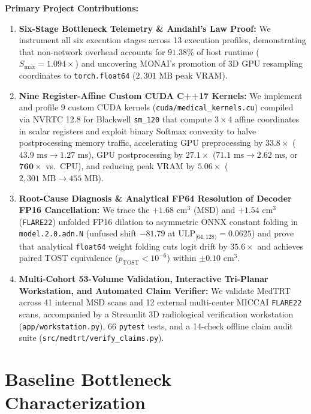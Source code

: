 \documentclass[10pt,twocolumn]{article}
\begin{document}
\noindent\textbf{Primary Project Contributions:}
\begin{enumerate}
    \item \textbf{Six-Stage Bottleneck Telemetry \& Amdahl's Law Proof:} We instrument all six execution stages across 13 execution profiles, demonstrating that non-network overhead accounts for $91.38\%$ of host runtime ($S_{\max} = 1.094\times$) and uncovering MONAI's promotion of 3D GPU resampling coordinates to \texttt{torch.float64} ($2,301\text{ MB}$ peak VRAM).
    \item \textbf{Nine Register-Affine Custom CUDA C++17 Kernels:} We implement and profile 9 custom CUDA kernels (\texttt{cuda/medical\_kernels.cu}) compiled via NVRTC 12.8 for Blackwell \texttt{sm\_120} that compute $3 \times 4$ affine coordinates in scalar registers and exploit binary Softmax convexity to halve postprocessing memory traffic, accelerating GPU preprocessing by $\mathbf{33.8\times}$ ($43.9\text{ ms} \to 1.27\text{ ms}$), GPU postprocessing by $\mathbf{27.1\times}$ ($71.1\text{ ms} \to 2.62\text{ ms}$, or $\mathbf{760\times}$ vs.\ CPU), and reducing peak VRAM by $\mathbf{5.06\times}$ ($2,301\text{ MB} \to 455\text{ MB}$).
    \item \textbf{Root-Cause Diagnosis \& Analytical FP64 Resolution of Decoder FP16 Cancellation:} We trace the $+1.68\text{ cm}^3$ (MSD) and $+1.54\text{ cm}^3$ (\texttt{FLARE22}) unfolded FP16 dilation to asymmetric ONNX constant folding in \texttt{model.2.0.adn.N} (unfused shift $-81.79$ at $\text{ULP}_{[64,128)} = 0.0625$) and prove that analytical \texttt{float64} weight folding cuts logit drift by $\mathbf{35.6\times}$ and achieves paired TOST equivalence ($p_{\text{TOST}} < 10^{-6}$) within $\pm 0.10\text{ cm}^3$.
    \item \textbf{Multi-Cohort 53-Volume Validation, Interactive Tri-Planar Workstation, and Automated Claim Verifier:} We validate MedTRT across 41 internal MSD scans and 12 external multi-center MICCAI \texttt{FLARE22} scans, accompanied by a Streamlit 3D radiological verification workstation (\texttt{app/workstation.py}), 66 \texttt{pytest} tests, and a 14-check offline claim audit suite (\texttt{src/medtrt/verify\_claims.py}).
\end{enumerate}

\section{Baseline Bottleneck Characterization}
\label{sec:bottlenecks}
\end{document}
